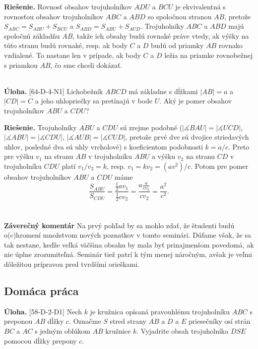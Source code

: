 \documentclass[11pt,a4paper,oneside,final]{book}
\newcommand{\ul}{\textbf{Úloha.} }
\newcommand{\rie}{\textbf{Riešenie.} }
\newcommand{\ma}{\measuredangle}
\begin{document}
\rie Rovnosť obsahov trojuholníkov $ADU$ a $BCU$ je ekvivalentná s rovnosťou obsahov trojuholníkov $ABC$ a $ABD$ so spoločnou stranou $AB$, pretože $S_{ABC}=S_{ABU}+S_{BCU}$ a $S_{ABD}=S_{ABU}+S_{AUD}$. Trojuholníky $ABC$ a $ABD$ majú spoločnú základňu $AB$, takže ich obsahy budú rovnaké práve vtedy, ak výšky na túto stranu budú rovnaké, resp. ak body $C$ a $D$ budú od priamky $AB$ rovnako vzdialené. To nastane len v prípade, ak body $C$ a $D$ ležia na priamke rovnobežnej s priamkou $AB$, čo sme chceli dokázať.\\
\\
\begin{tcolorbox}[breakable,notitle,boxrule=0pt,colback=light-gray,colframe=light-gray]\ul [64-D-4-N1] Lichobežník $ABCD$ má základne s dĺžkami $|AB|=a$ a $|CD|=C$ a jeho uhlopriečky sa pretínajú v bode $U$. Aký je pomer obsahov trojuholníkov $ABU$ a $CDU$?

\end{tcolorbox}

\rie Trojuholníky $ABU$ a $CDU$ sú zrejme podobné ($|\ma BAU|=|\ma UCD|$, $|\ma ABU|=|\ma CDU|$, $|\ma AUB|=|\ma CUD|$, pretože prvé dve sú dvojice striedavých uhlov, posledné dva sú uhly vrcholové) s koeficientom podobnosti $k=a/c$. Preto pre výšku $v_1$ na stranu $AB$ v trojuholníku $ABU$ a výšku $v_2$ na stranu $CD$ v trojuholníku $CDU$ platí $v_1/v_2=k$, resp. $v_1=kv_2=(av^2)/c$. Potom pre pomer obsahov trojuholníkov $ABU$ a $CDU$ máme
$$\frac{S_{ABU}}{S_{CDU}}=\frac{\frac{1}{2}av_1}{\frac{1}{2}cv_2}=\frac{a\frac{a}{cv_2}}{cv_2}=\frac{a^2}{c^2}.$$\\
\\
\textbf{Záverečný komentár} Na prvý pohľad by sa mohlo zdať, že študenti budú o(c)hromení množstvom nových poznatkov v tomto seminári. Dúfame však, že sa tak nestane, keďže veľká väčšina obsahu by mala byť prinajmenšom povedomá, ak nie úplne zrozumiteľná. Seminár tiež patrí k tým menej náročným, avšak je veľmi dôležitou prípravou pred tvrdšími orieškami.

\subsection*{Domáca práca}
\begin{tcolorbox}[breakable,notitle,boxrule=0pt,colback=light-gray,colframe=light-gray]\ul [58-D-2-D1] Nech $k$ je kružnica opísaná pravouhlému trojuholníku $ABC$ s preponou $AB$ dĺžky $c$. Označme $S$ stred strany $AB$ a $D$ a $E$ priesečníky osí strán $BC$ a $AC$ s jedným oblúkom $AB$ kružnice $k$. Vyjadrite obsah trojuholníka $DSE$ pomocou dĺžky prepony $c$.

\end{tcolorbox}
\end{document}
